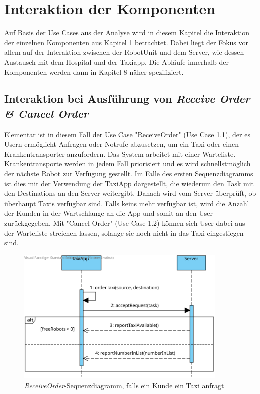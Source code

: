 \section{Interaktion der Komponenten}
Auf Basis der Use Cases aus der Analyse wird in diesem Kapitel die Interaktion der einzelnen Komponenten aus Kapitel 1 betrachtet. 
Dabei liegt der Fokus vor allem auf der Interaktion zwischen der RobotUnit und dem Server, wie dessen Austausch mit dem Hospital und der Taxiapp. 
Die Abläufe innerhalb der Komponenten werden dann in Kapitel 8 näher spezifiziert. \\


\subsection*{Interaktion bei Ausführung von \emph{Receive Order \& Cancel Order}}

Elementar ist in diesem Fall der Use Case "ReceiveOrder" (Use Case 1.1), der es Usern ermöglicht Anfragen oder Notrufe abzusetzen, um ein Taxi oder einen Krankentransporter anzufordern. 
Das System arbeitet mit einer Warteliste. 
Krankentransporte werden in jedem Fall priorisiert und es wird schnellstmöglich der nächste Robot zur Verfügung gestellt. 
Im Falle des ersten Sequenzdiagramms ist dies mit der Verwendung der TaxiApp dargestellt, die wiederum den Task mit den Destinations an den Server weitergibt. 
Danach wird vom Server überprüft, ob überhaupt Taxis verfügbar sind.
Falls keins mehr verfügbar ist, wird die Anzahl der Kunden in der Wartschlange an die App und somit an den User zurückgegeben. 
Mit "Cancel Order" (Use Case 1.2) können sich User dabei aus der Warteliste streichen lassen, solange sie noch nicht in das Taxi eingestiegen sind. \\

\begin{figure}[H]
	\centering
	\includegraphics[width=0.9\textwidth]{img/2-Entwurf-ReceiveOrder-Taxi}
	\caption{\emph{ReceiveOrder}-Sequenzdiagramm, falls ein Kunde ein Taxi anfragt}
	\label{SequenzDiagrammInteraktion}
\end{figure}

